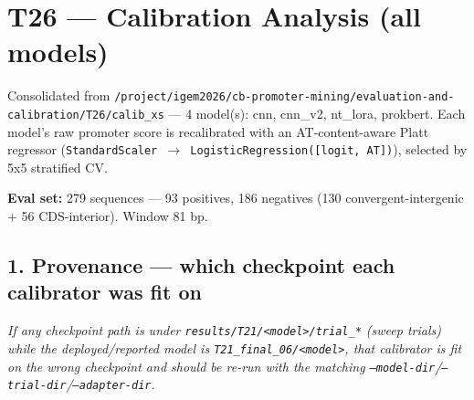\documentclass[10pt]{article}
\begin{document}
\section*{T26 --- Calibration Analysis (all models)}

Consolidated from \texttt{/project/igem2026/cb-promoter-mining/evaluation-and-calibration/T26/calib\_xs} --- 4 model(s): cnn, cnn\_v2, nt\_lora, prokbert. Each model's raw promoter score is recalibrated with an AT-content-aware Platt regressor (\texttt{StandardScaler $\to$ LogisticRegression([logit, AT])}), selected by 5x5 stratified CV.

\textbf{Eval set:} 279 sequences --- 93 positives, 186 negatives (130 convergent-intergenic + 56 CDS-interior). Window 81 bp.

\subsection*{1. Provenance --- which checkpoint each calibrator was fit on}

\begin{center}
\end{center}

{\itshape If any checkpoint path is under \texttt{results/T21/<model>/trial\_*} (sweep trials) while the deployed/reported model is \texttt{T21\_final\_06/<model>}, that calibrator is fit on the wrong checkpoint and should be re-run with the matching \texttt{--model-dir}/\texttt{--trial-dir}/\texttt{--adapter-dir}.\par}
\end{document}
